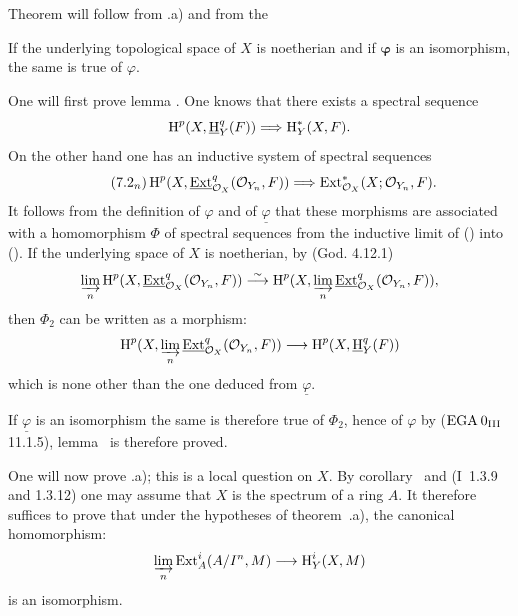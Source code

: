Theorem  will follow from .a) and from the

\begin{suplemma} \label{II.7} If the underlying topological space of $X$ is noetherian and if $\boldsymbol{\varphi}$ is an isomorphism, the same is true of $\varphi$.
\end{suplemma}

One will first prove lemma . One knows that there exists a spectral sequence
\begin{equation} \label{eq:II.7.1}
\H^p(X, {\SheafH}_Y^q(F)) \To \H_Y^{\ast}(X, F).
\end{equation}
On the other hand one has an inductive system of spectral sequences
\begin{equation*} \label{eq:II.7.2n} \tag{7.2$_n$}\stepcounter{equation}
\H^p(X, {\SheafExt}_{\OX}^q(\Oo_{Y_n}, F)) \To \Ext_{\OX}^{\ast}(X;\Oo_{Y_n}, F).
\end{equation*}
It follows from the definition of $\varphi$ and of $\underline{\varphi}$ that these morphisms are associated with a homomorphism $\Phi$ of spectral sequences from the inductive limit of () into (). If the underlying space of $X$ is noetherian, by (God. 4.12.1)
\begin{equation*}
\varinjlim_{n} \operatorname{H}^p(X, {\operatorname{\underline{Ext}}}_{\mathcal{O}_X}^q({\mathcal O}_{Y_n}, F))\overset{\sim}{\longrightarrow} \operatorname{H}^p(X, \varinjlim_{n} {\operatorname{\underline{Ext}}}_{\mathcal{O}_X}^q({\mathcal O}_{Y_n}, F)),
\end{equation*}
then $\Phi_2$ can be written as a morphism:
\begin{equation*} \H^p(X, \varinjlim_{n} {\SheafExt}_{\OX}^q(\Oo_{Y_n}, F)) \to \H^p(X, {\SheafH}_Y^q(F))
\end{equation*}
which is none other than the one deduced from $\underline{\varphi}$.

If $\underline{\varphi}$ is an isomorphism the same is therefore true of $\Phi_2$, hence of $\varphi$ by ($\textup{EGA}\kern.2em 0_{\textup{III}}$ 11.1.5), lemma~ is therefore proved.

One will now prove .a); this is a local question on $X$. By corollary~ and (\EGA I~1.3.9 and 1.3.12) one may assume that $X$ is the spectrum of a ring $A$. It therefore suffices to prove that under the hypotheses of theorem~.a), the canonical homomorphism:
\begin{equation} \label{eq:II.7.3} \varinjlim_{n} \Ext_A^i(A/I^n, M) \to \H_Y^i(X, M)
\end{equation}
is an isomorphism.

